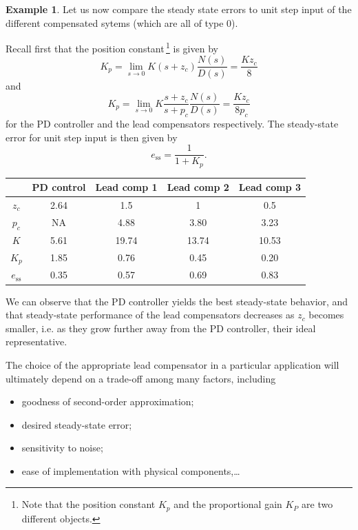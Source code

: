 \documentclass[a4paper,11pt]{report}
\theoremstyle{definition}
\newcommand{\sse}{\mathrm{ss}}
\newtheorem{mdexample}{Example}
\newenvironment{example}%
  {\vspace{0.1cm}\begin{mdframed}[backgroundcolor=lightgray]\begin{mdexample}}%
  {\end{mdexample}\end{mdframed}\vspace{0.1cm}}
\begin{document}
\begin{example}
  Let us now compare the steady state errors to unit step input of the
  different compensated sytems (which are all of type 0).

  Recall first that the position constant\,\footnote{Note that the
    position constant $K_p$ and the proportional gain $K_P$ are two
    different objects.} is given by
  \[
  K_p = \lim_{s\to 0} K(s+z_c)\frac{N(s)}{D(s)} = \frac{Kz_c}{8}
  \]
  and
  \[
  K_p = \lim_{s\to 0} K\frac{s+z_c}{s+p_c}\frac{N(s)}{D(s)} = \frac{Kz_c}{8p_c}
  \]
  for the PD controller and the lead compensators respectively. The
  steady-state error for unit step input is then given by
  \[
  e_\sse = \frac{1}{1+K_p}.
  \]

  \vspace{0.2cm}

  \begin{tabular}{|c|c|c|c|c|}
    \hline
    &PD control&Lead comp 1&Lead comp 2&Lead comp 3\\\hline
    $z_c$&2.64&1.5&1&0.5\\\hline      
    $p_c$&NA&4.88&3.80&3.23\\\hline      
    $K$&5.61&19.74&13.74&10.53\\\hline      
    $K_p$&1.85&0.76&0.45&0.20\\\hline      
    $e_\sse$&0.35&0.57&0.69&0.83\\\hline      
  \end{tabular}

  \vspace{0.2cm}

  We can observe that the PD controller yields the best steady-state
  behavior, and that steady-state performance of the lead compensators
  decreases as $z_c$ becomes smaller, i.e. as they grow further away
  from the PD controller, their ideal representative.

  The choice of the appropriate lead compensator in a particular
  application will ultimately depend on a trade-off among many
  factors, including
  \begin{itemize}
  \item goodness of second-order approximation;
  \item desired steady-state error;
  \item sensitivity to noise;
  \item ease of implementation with physical components,\dots
  \end{itemize}
\end{example}
\end{document}
